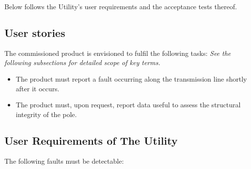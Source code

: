 \documentclass[12pt]{article}
\begin{document}
Below follows the Utility's user requirements and the acceptance tests thereof.

\subsection{User stories}
The commissioned product is envisioned to fulfil the following tasks:\newline
\emph{See the following subsections for detailed scope of key terms.}
\begin{itemize}
  \item The product must report a fault occurring along the transmission line shortly after it occurs.
  \item The product must, upon request, report data useful to assess the structural integrity of the pole.
\end{itemize}

\subsection{User Requirements of The Utility}
The following faults must be detectable:
\end{document}
